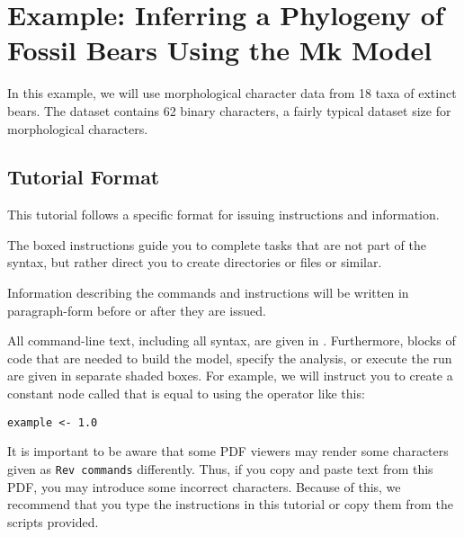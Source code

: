 \section{Example: Inferring a Phylogeny of Fossil Bears Using the Mk Model}\label{sec:dm_simple}

In this example, we will use morphological character data from 18 taxa of extinct bears. 
The dataset contains 62 binary characters, a fairly typical dataset size for morphological characters. \par

\medskip
\subsection{Tutorial Format}\label{subsect:Exercise-Format}

This tutorial follows a specific format for issuing instructions and information.

{\begin{framed}
The boxed instructions guide you to complete tasks that are not part of the \RevBayes syntax, but rather direct you to create directories or files or similar.
\end{framed}}


Information describing the commands and instructions will be written in paragraph-form before or after they are issued.

All command-line text, including all \Rev syntax, are given in . 
Furthermore, blocks of \Rev code that are needed to build the model, specify the analysis, or execute the run are given in separate shaded boxes.
For example, we will instruct you to create a constant node called  that is equal to  using the \cl{<-} operator like this:
{\tt \begin{snugshade*}
\begin{lstlisting}
example <- 1.0
\end{lstlisting}
\end{snugshade*}
}

It is important to be aware that some PDF viewers may render some characters given as \colorbox{shadecolor}{\tt{Rev commands}} differently. 
Thus, if you copy and paste text from this PDF, you may introduce some incorrect characters. 
Because of this, we recommend that you type the instructions in this tutorial or copy them from the scripts provided. 


